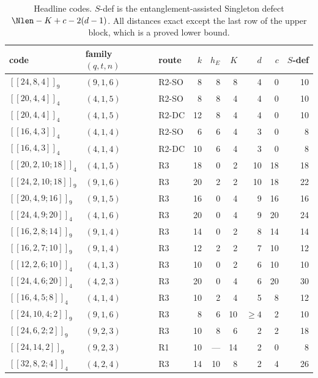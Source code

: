 \begin{table}[t]
\centering
\caption{Headline codes. $S$-def is the entanglement-assisted Singleton defect
$\Nlen-K+c-2(d-1)$. All distances exact except the last row of the upper
block, which is a proved lower bound.}
\label{tab:headline}
\small
\begin{tabular}{@{}lllrrrrrr@{}}
\toprule
code & family $(q,t,n)$ & route & $k$ & $h_E$ & $K$ & $d$ & $c$ & $S$-def\\
\midrule
$[[24,8,4]]_9$     & $(9,1,6)$ & R2-SO & 8  & 8 & 8  & 4  & 0  & 10\\
$[[20,4,4]]_4$     & $(4,1,5)$ & R2-SO & 8  & 8 & 4  & 4  & 0  & 10\\
$[[20,4,4]]_4$     & $(4,1,5)$ & R2-DC & 12 & 8 & 4  & 4  & 0  & 10\\
$[[16,4,3]]_4$     & $(4,1,4)$ & R2-SO & 6  & 6 & 4  & 3  & 0  & 8\\
$[[16,4,3]]_4$     & $(4,1,4)$ & R2-DC & 10 & 6  & 4 & 3  & 0  & 8\\
$[[20,2,10;18]]_4$ & $(4,1,5)$ & R3    & 18 & 0 & 2  & 10 & 18 & 18\\
$[[24,2,10;18]]_9$ & $(9,1,6)$ & R3    & 20 & 2 & 2  & 10 & 18 & 22\\
$[[20,4,9;16]]_9$  & $(9,1,5)$ & R3    & 16 & 0 & 4  & 9  & 16 & 16\\
$[[24,4,9;20]]_4$  & $(4,1,6)$ & R3    & 20 & 0 & 4  & 9  & 20 & 24\\
$[[16,2,8;14]]_9$  & $(9,1,4)$ & R3    & 14 & 0 & 2  & 8  & 14 & 14\\
$[[16,2,7;10]]_9$  & $(9,1,4)$ & R3    & 12 & 2 & 2  & 7  & 10 & 12\\
$[[12,2,6;10]]_4$  & $(4,1,3)$ & R3    & 10 & 0 & 2  & 6  & 10 & 10\\
$[[24,4,6;20]]_4$  & $(4,2,3)$ & R3    & 20 & 0 & 4  & 6  & 20 & 30\\
$[[16,4,5;8]]_4$   & $(4,1,4)$ & R3    & 10 & 2 & 4  & 5  & 8  & 12\\
$[[24,10,4;2]]_9$  & $(9,1,6)$ & R3    & 8  & 6 & 10 & $\ge4$ & 2 & 10\\
\midrule
$[[24,6,2;2]]_9$   & $(9,2,3)$ & R3 & 10 & 8  & 6 & 2 & 2 & 18\\
$[[24,14,2]]_9$    & $(9,2,3)$ & R1 & 10 & --- & 14 & 2 & 0 & 8\\
$[[32,8,2;4]]_4$   & $(4,2,4)$ & R3 & 14 & 10 & 8 & 2 & 4 & 26\\
\bottomrule
\end{tabular}
\end{table}

